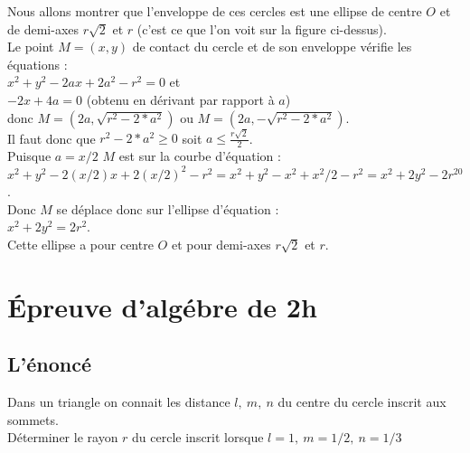 \documentclass[a4paper,11pt]{book}
\begin{document}
Nous allons montrer que l'enveloppe de ces cercles est une ellipse de centre 
$O$ et de demi-axes $r\sqrt 2$ et $r$ (c'est ce que l'on voit sur la figure 
ci-dessus).\\
Le point $M=(x,y)$ de contact  du 
cercle et de son enveloppe v\'erifie les  \'equations :\\
$x^2+y^2-2ax+2a^2-r^2=0$ et\\
$-2x+4a=0$ (obtenu en d\'erivant par rapport \`a $a$)\\ 
donc $M=(2a,\sqrt{r^2-2*a^2})$ ou $M=(2a,-\sqrt{r^2-2*a^2})$.\\
Il faut donc que $r^2-2*a^2\geq 0$ soit $a\leq \frac{r\sqrt 2}{2}$.\\
Puisque  $a=x/2$ $M$ est sur la courbe d'\'equation  :\\
$x^2+y^2-2(x/2)x+2{(x/2)}^2-r^2=x^2+y^2-x^2+x^2/2-r^2=x^2+2y^2-2r^20$.\\
Donc $M$ se d\'eplace donc sur l'ellipse d'\'equation :\\
$x^2+2y^2=2r^2$. \\
Cette ellipse a pour centre $O$ et pour demi-axes $r\sqrt 2$ et $r$.



\section{\'Epreuve d'alg\'ebre de 2h}
\subsection{L'\'enonc\'e}
Dans un triangle on connait les distance $l,\ m,\ n$ du centre du cercle 
inscrit aux sommets.\\
D\'eterminer le rayon $r$ du cercle inscrit lorsque $l=1,\ m=1/2,\ n=1/3$\\ 
\end{document}
